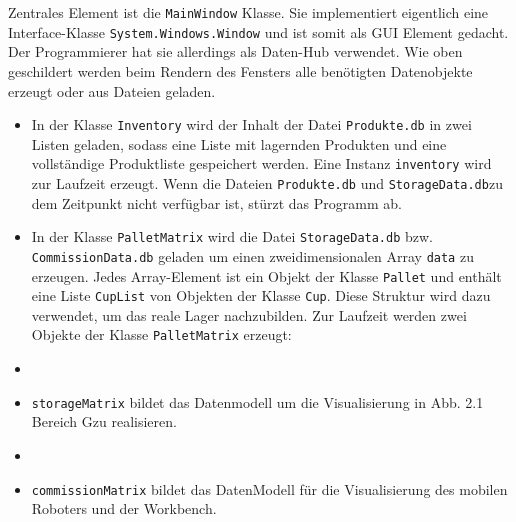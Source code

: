     Zentrales Element ist die \verb|MainWindow| Klasse.
    Sie implementiert eigentlich eine Interface-Klasse \verb|System.Windows.Window| und ist somit als GUI Element gedacht.
    Der Programmierer hat sie allerdings als Daten-Hub verwendet.
    Wie oben geschildert werden beim Rendern des Fensters alle benötigten Datenobjekte erzeugt oder aus Dateien geladen.
    \begin{itemize}
        \item In der Klasse \verb|Inventory| wird der Inhalt der Datei \verb|Produkte.db| in zwei Listen geladen, sodass
        eine Liste mit lagernden Produkten und eine vollständige Produktliste gespeichert werden.
        Eine Instanz \verb|inventory| wird zur Laufzeit erzeugt. Wenn die Dateien \verb|Produkte.db| und
        \verb|StorageData.db|zu dem Zeitpunkt nicht verfügbar ist, stürzt das Programm ab.
        \item In der Klasse \verb|PalletMatrix| wird die Datei \verb|StorageData.db| bzw. \verb|CommissionData.db|
        geladen um einen zweidimensionalen Array \verb|data| zu erzeugen.
        Jedes Array-Element ist ein Objekt der Klasse \verb|Pallet| und enthält eine Liste \verb|CupList| von Objekten
        der Klasse \verb|Cup|.
        Diese Struktur wird dazu verwendet, um das reale Lager nachzubilden.
        Zur Laufzeit werden zwei Objekte der Klasse \verb|PalletMatrix| erzeugt:
        \item \item \verb|storageMatrix| bildet das Datenmodell um die Visualisierung in Abb. 2.1 Bereich \grqq G\glqq zu realisieren.
        \item \item \verb|commissionMatrix| bildet das DatenModell für die Visualisierung des mobilen Roboters und der
        Workbench.
    \end{itemize}
